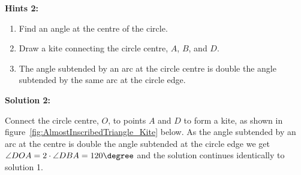 \textbf{Hints 2:}

\begin{enumerate}
	\item Find an angle at the centre of the circle.
	\item Draw a kite connecting the circle centre, $A$, $B$, and $D$.
	\item The angle subtended by an arc at the circle centre is double the angle subtended by the same arc at the circle edge.
\end{enumerate}

\textbf{Solution 2:}

Connect the circle centre, $O$, to points $A$ and $D$ to form a kite, as shown in figure~\ref{fig:AlmostInscribedTriangle_Kite} below. As the angle subtended by an arc at the centre is double the angle subtended at the circle edge we get $\angle DOA = 2 \cdot \angle DBA = 120\degree$ and the solution continues identically to solution 1.

